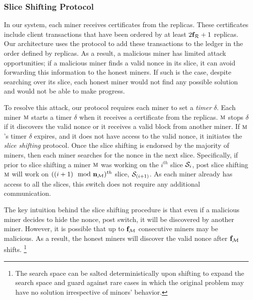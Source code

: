 \subsubsection{Slice Shifting Protocol}
In our \DualChain{} system, each miner receives certificates from the \pbft{} 
replicas. These certificates include client transactions that have been 
ordered by at least $2\mathbf{f}_{\mathcal{R}}+1$ replicas. Our \DualChain{} architecture 
uses the \PoC{} protocol to add these transactions to the ledger in the order 
defined by \pbft{} replicas. As a result, a malicious miner has limited attack 
opportunities; if a malicious miner finds a valid nonce in its slice, it can 
avoid forwarding this information to the honest miners. If such is the case, 
despite searching over its slice, each honest miner would not find any possible 
solution and would not be able to make progress.

To resolve this attack, our \PoC{} protocol requires each miner to set a 
{\em timer} $\delta$. Each miner $\textsc{m}{}$ starts a timer $\delta$ when it 
receives a certificate from the \pbft{} replicas. $\textsc{m}{}$ stops $\delta$ 
if it discovers the valid nonce or it receives a valid block from another miner.
If $\textsc{m}{}$'s timer $\delta$ expires, and it does not have access to the valid 
nonce, it initiates the {\em slice shifting} protocol. Once the slice shifting 
is endorsed by the majority of miners, then each miner searches for the nonce 
in the next slice. Specifically, if prior to slice shifting a miner $\textsc{m}{}$ 
was working on the $i^{th}$ slice $\mathcal{S}_{i}$, post slice shifting $\textsc{m}{}$ will 
work on $((i+1) \mod \n{\Miners{}})^{th}$ slice, $\mathcal{S}_{(i+1)}$. As each miner 
already has access to all the slices, this switch does not require any 
additional communication.

The key intuition behind the slice shifting procedure is that even if a malicious 
miner decides to hide the nonce, post switch, it will be discovered by another miner.
However, it is possible that up to $\mathbf{f}_{\mathcal{M}{}}$ consecutive miners may be malicious. 
As a result, the honest miners will discover the valid nonce after $\mathbf{f}_{\mathcal{M}{}}$ shifts.%
\footnote{
The search space can be salted deterministically upon shifting to expand the search 
space and guard against rare cases in which the original problem may have no solution irrespective of minors' behavior.
}




